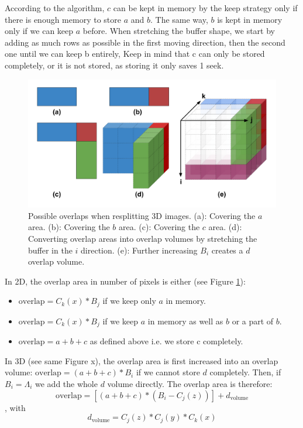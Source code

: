 \documentclass[conference]{IEEEtran}
\begin{document}
According to the algorithm, $c$ can be kept in memory by the keep strategy only if there is enough memory to store $a$ and $b$.
The same way, $b$ is kept in memory only if we can keep $a$ before.
When stretching the buffer shape, we start by adding as much rows as possible in the first moving direction, then the second one until we can keep b entirely,
Keep in mind that c can only be stored completely, or it is not stored, as storing it only saves 1 seek.

\begin{figure}[h!]
\centering
\includegraphics[scale=0.3]{./figures/overlapsin3d.png}
\caption{Possible overlaps when resplitting 3D images.
(a): Covering the $a$ area.
(b): Covering the $b$ area.
(c): Covering the $c$ area.
(d): Converting overlap areas into overlap volumes by stretching the buffer in the $i$ direction.
(e): Further increasing $B_i$ creates a $d$ overlap volume.
}
\label{fig:overlapsin3d}
\end{figure}

In 2D, the overlap area in number of pixels is either (see Figure \ref{fig:overlapsin3d}):
\begin{itemize}
  \item $\textrm{overlap} = C_k(x) * B_j$ if we keep only $a$ in memory.
  \item $\textrm{overlap} = C_k(x) * B_j$ if we keep $a$ in memory as well as $b$ or a part of $b$.
  \item $\textrm{overlap} = a + b + c$ as defined above i.e. we store c completely.
\end{itemize}

In 3D (see same Figure x), the overlap area is first increased into an overlap volume:
$\textrm{overlap} = (a + b + c) * B_i$ if we cannot store $d$ completely.
Then, if $B_i = \Lambda_i$ we add the whole $d$ volume directly.
The overlap area is therefore:
$$\textrm{overlap} = [(a + b + c) * (B_i - C_j(z))] + d_{\textrm{volume}}$$, with
$$d_{\textrm{volume}} = C_j(z) * C_j(y) * C_k(x)$$
\end{document}
